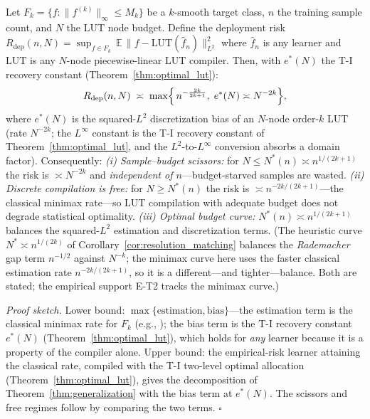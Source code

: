 \setcounter{theorem}{13}
\begin{theorem}
\label{thm:compile_aware_minimax}
Let $F_k = \{f : \|f^{(k)}\|_\infty \leq M_k\}$ be a $k$-smooth target
class, $n$ the training sample count, and $N$ the LUT node budget.
Define the deployment risk
$R_{\text{dep}}(n, N) = \sup_{f \in F_k}\,
\mathbb{E}\,\|f - \text{LUT}(\hat f_n)\|_{L^2}^2$ where $\hat f_n$ is any
learner and $\text{LUT}$ is any $N$-node piecewise-linear LUT compiler.
Then, with $e^{*}(N)$ the T-I recovery constant
(Theorem~\ref{thm:optimal_lut}):
\begin{equation}
R_{\text{dep}}(n,N) \;\asymp\;
\max\Bigl\{\, n^{-\frac{2k}{2k+1}},\; e^{*}(N) \asymp N^{-2k} \Bigr\},
\label{eq:minimax_deploy}
\end{equation}
where $e^{*}(N)$ is the squared-$L^2$ discretization bias of an
$N$-node order-$k$ LUT (rate $N^{-2k}$; the $L^\infty$ constant is the
T-I recovery constant of Theorem~\ref{thm:optimal_lut}, and the
$L^2$-to-$L^\infty$ conversion absorbs a domain factor).
Consequently:
\emph{(i) Sample--budget scissors:} for $N \leq N^{*}(n) \asymp
n^{1/(2k+1)}$ the risk is $\asymp N^{-2k}$ and \emph{independent of
$n$}---budget-starved samples are wasted. \emph{(ii) Discrete
compilation is free:} for $N \geq N^{*}(n)$ the risk is $\asymp
n^{-2k/(2k+1)}$---the classical minimax rate---so LUT compilation with
adequate budget does not degrade statistical optimality.
\emph{(iii) Optimal budget curve:} $N^{*}(n) \asymp n^{1/(2k+1)}$
balances the squared-$L^2$ estimation and discretization terms. (The
heuristic curve $N^{*} \asymp n^{1/(2k)}$ of
Corollary~\ref{cor:resolution_matching} balances the \emph{Rademacher}
gap term $n^{-1/2}$ against $N^{-k}$; the minimax curve here uses the
faster classical estimation rate $n^{-2k/(2k+1)}$, so it is a
different---and tighter---balance. Both are stated; the empirical
support E-T2 tracks the minimax curve.)
\end{theorem}

\vspace{2pt}
\noindent\textit{Proof sketch.}
Lower bound: $\max\{\text{estimation}, \text{bias}\}$---the estimation
term is the classical minimax rate for $F_k$ (e.g.,
\cite{tsybakov2009introduction}); the bias term is the T-I recovery
constant $e^{*}(N)$ (Theorem~\ref{thm:optimal_lut}), which holds for
\emph{any} learner because it is a property of the compiler alone.
Upper bound: the empirical-risk learner attaining the classical rate,
compiled with the T-I two-level optimal allocation
(Theorem~\ref{thm:optimal_lut}), gives the decomposition of
Theorem~\ref{thm:generalization} with the bias term at $e^{*}(N)$.
The scissors and free regimes follow by comparing the two terms.
$\square$

